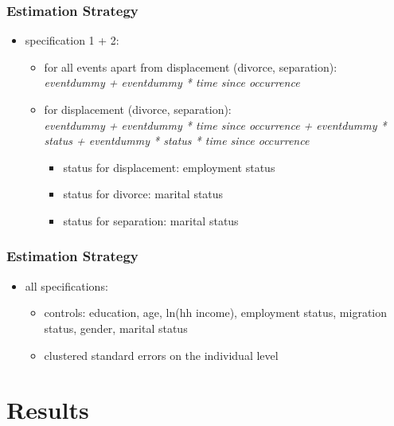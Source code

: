 \documentclass{beamer}
\begin{document}
\begin{frame}[t]\frametitle{Estimation Strategy}
	\begin{itemize}
		\item<+-> specification 1 + 2:\\
			\begin{itemize}
			\setlength{\itemsep}{20pt}
			\item<+-> for all events apart from displacement (divorce, separation):\\
			{\centering
			\textit{eventdummy + eventdummy * time since occurrence}\\}
			\item<+-> for displacement (divorce, separation):\\
			{\centering
			\textit{eventdummy + eventdummy * time since occurrence + eventdummy * status + eventdummy * status * time since occurrence}\\}

		\begin{itemize}
			\item status for displacement: employment status
			\item status for divorce: marital status
			\item status for separation: marital status
		\end{itemize}
			\end{itemize}
\end{itemize}
\end{frame}

\begin{frame}[t]\frametitle{Estimation Strategy}
\begin{itemize}
	\item all specifications:\\
	\begin{itemize}
		\setlength{\itemsep}{20pt}
		\item controls: education, age, ln(hh income), employment status, migration status, gender, marital status
		\item clustered standard errors on the individual level
		\end{itemize}
	\end{itemize}
\end{frame}

\section{Results} %
\label{sec:results}
\end{document}
